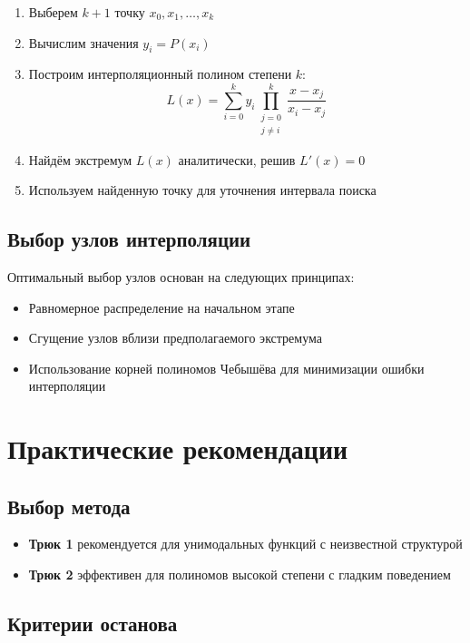 \documentclass[12pt,a4paper]{article}
\begin{document}
\begin{enumerate}
    \item Выберем $k+1$ точку $x_0, x_1, \ldots, x_k$
    \item Вычислим значения $y_i = P(x_i)$
    \item Построим интерполяционный полином степени $k$:
    \begin{equation}
        L(x) = \sum_{i=0}^k y_i \prod_{\substack{j=0\\j \neq i}}^k \frac{x - x_j}{x_i - x_j}
    \end{equation}
    \item Найдём экстремум $L(x)$ аналитически, решив $L'(x) = 0$
    \item Используем найденную точку для уточнения интервала поиска
\end{enumerate}

\subsection{Выбор узлов интерполяции}

Оптимальный выбор узлов основан на следующих принципах:
\begin{itemize}
    \item Равномерное распределение на начальном этапе
    \item Сгущение узлов вблизи предполагаемого экстремума
    \item Использование корней полиномов Чебышёва для минимизации ошибки интерполяции
\end{itemize}

\section{Практические рекомендации}

\subsection{Выбор метода}

\begin{itemize}
    \item \textbf{Трюк 1} рекомендуется для унимодальных функций с неизвестной структурой
    \item \textbf{Трюк 2} эффективен для полиномов высокой степени с гладким поведением
\end{itemize}

\subsection{Критерии останова}
\end{document}
